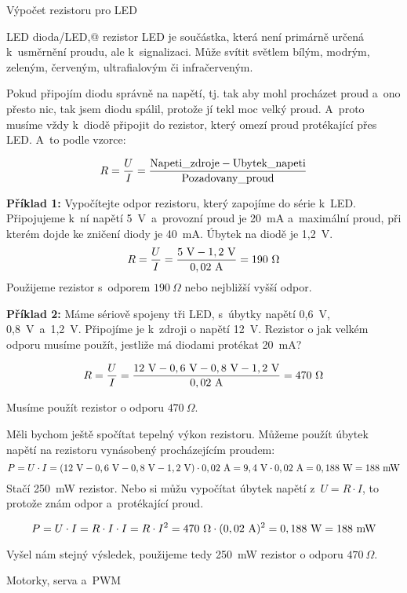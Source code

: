 
\secc Výpočet rezistoru pro LED 

LED \ii dioda/LED,@ \ii rezistor \ii LED je součástka, která není primárně určená k~usměrnění proudu, ale k~signalizaci. Může svítit světlem bílým, modrým, zeleným, červeným, ultrafialovým či infračerveným.

Pokud připojím diodu správně na napětí, tj. tak aby mohl procházet proud a~ono přesto nic, tak jsem diodu spálil, protože jí tekl moc velký proud. A~proto musíme vždy k~diodě připojit do   \Black 
 rezistor, který omezí proud protékající přes LED. A~to podle vzorce:

$$R = \frac{U}{I} = \rm \frac{Napeti\_zdroje - Ubytek\_napeti}{Pozadovany\_proud}$$

{\bf Příklad 1:} Vypočítejte odpor rezistoru, který zapojíme do série k~LED. Připojujeme k~ní napětí 5~V~a~provozní proud je 20~mA a~maximální proud, při kterém dojde ke zničení diody je 40~mA. Úbytek na diodě je 1,2~V.
$$R = \frac{U}{I} = \rm \frac{5\ V - 1,2 \ V}{0,02 \ A} = 190\ \Omega$$
Použijeme rezistor s~odporem $190\ \Omega$ nebo nejbližší vyšší odpor.

{\bf Příklad 2:} Máme sériově spojeny tři LED, s~úbytky napětí 0,6~V, 0,8~V~a~1,2~V. Připojíme je k~zdroji o napětí 12~V. Rezistor o jak velkém odporu musíme použít, jestliže má diodami protékat 20~mA?

$$R = \frac{U}{I} = \rm \frac{12\ V-0,6\ V-0,8\ V-1,2\ V}{0,02 \ A} = 470\ \Omega$$

Musíme použít rezistor o odporu $470\ \Omega$. 

Měli bychom ještě spočítat tepelný výkon rezistoru. Můžeme použít úbytek napětí na rezistoru vynásobený procházejícím proudem:
$$P = U \cdot I = \rm (12\ V-0,6\ V-0,8\ V-1,2\ V) \cdot 0,02\ A = 9,4\ V \cdot 0,02\ A = 0,188\ W = 188\ mW$$
Stačí 250~mW rezistor. Nebo si můžu vypočítat úbytek napětí z~$U = R \cdot I$, to protože znám odpor a~protékající proud.

$$P = U \cdot I = R \cdot I \cdot I = R \cdot I^2 = 470\ \Omega \cdot \rm (0,02\ A)^2 = 0,188\ W = 188\ mW$$

Vyšel nám stejný výsledek, použijeme tedy 250~mW rezistor o odporu $470\ \Omega$.


\sec Motorky, serva a~PWM 

